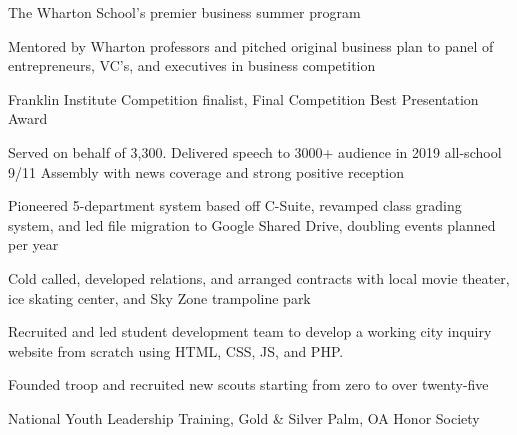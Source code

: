 \documentclass[]{deedy-resume-openfont}
\begin{document}
\begin{minipage}[t]{0.69\textwidth}
\begin{tightemize}
\item The Wharton School's premier business summer program
\item Mentored by Wharton professors and pitched original business plan to panel of entrepreneurs, VC’s, and executives in business competition
\item Franklin Institute Competition finalist, Final Competition Best Presentation Award
\end{tightemize}
\sectionsep

\begin{tightemize}
\item Served on behalf of 3,300. Delivered speech to 3000+ audience in 2019 all-school 9/11 Assembly with news coverage and strong positive reception
\item Pioneered 5-department system based off C-Suite, revamped class grading system, and led file migration to Google Shared Drive, doubling events planned per year
\item Cold called, developed relations, and arranged contracts with local movie theater, ice skating center, and Sky Zone trampoline park
\end{tightemize}
\sectionsep

\begin{tightemize}
\item Recruited and led student development team to develop a working city inquiry website from scratch using HTML, CSS, JS, and PHP. 
\end{tightemize}
\sectionsep

\begin{tightemize}
\item Founded troop and recruited new scouts starting from zero to over twenty-five
\item National Youth Leadership Training, Gold \& Silver Palm, OA Honor Society
\end{tightemize}


\end{minipage}
\end{document}
